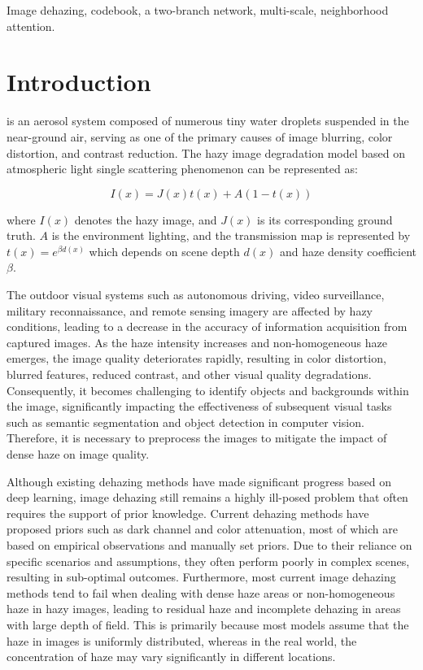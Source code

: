 \documentclass[lettersize,journal]{IEEEtran}
\begin{document}
\begin{IEEEkeywords}
Image dehazing, codebook, a two-branch network, multi-scale, neighborhood attention.
\end{IEEEkeywords}


\section{Introduction}
 is an aerosol system composed of numerous tiny water droplets suspended in the near-ground air, serving as one of the primary causes of image blurring, color distortion, and contrast reduction. The hazy image degradation model based on atmospheric light single scattering phenomenon\cite{mccartney1976optics} \cite{narasimhan2002vision} can be represented as:

\begin{equation}
	\label{scattering_model}
	I(x) = J(x)t(x) + A(1 - t(x))
\end{equation}

\noindent where $I(x)$ denotes the hazy image, and $J(x)$ is its corresponding ground truth. $A$ is the environment lighting, and the transmission map is represented by $t(x) = e^{\beta d(x)}$ which depends on scene depth $d(x)$ and haze density coefficient $\beta$. 

The outdoor visual systems such as autonomous driving, video surveillance, military reconnaissance, and remote sensing imagery are affected by hazy conditions, leading to a decrease in the accuracy of information acquisition from captured images. As the haze intensity increases and non-homogeneous haze emerges, the image quality deteriorates rapidly, resulting in color distortion, blurred features, reduced contrast, and other visual quality degradations. Consequently, it becomes challenging to identify objects and backgrounds within the image, significantly impacting the effectiveness of subsequent visual tasks such as semantic segmentation and object detection in computer vision. Therefore, it is necessary to preprocess the images to mitigate the impact of dense haze on image quality.

Although existing dehazing methods have made significant progress based on deep learning, image dehazing  still remains a highly ill-posed problem that often requires the support of prior knowledge. Current dehazing methods have proposed priors such as dark channel\cite{he2010single} and color attenuation\cite{land1971lightness}, most of which are based on empirical observations and manually set priors\cite{cai2016dehazenet, li2017aod}. Due to their reliance on specific scenarios and assumptions, they often perform poorly in complex scenes, resulting in sub-optimal outcomes. Furthermore, most current image dehazing methods tend to fail when dealing with dense haze areas or non-homogeneous haze in hazy images, leading to residual haze and incomplete dehazing in areas with large depth of field. This is primarily because most models assume that the haze in images is uniformly distributed, whereas in the real world, the concentration of haze may vary significantly in different locations.
\end{document}
